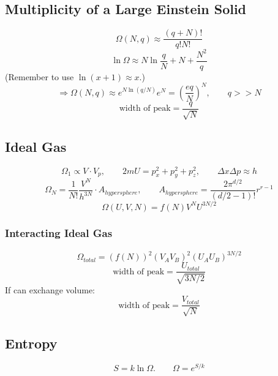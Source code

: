 \documentclass[a4paper,norsk, 10pt]{article}
\begin{document}
\subsection{Multiplicity of a Large Einstein Solid}
\begin{equation}
\Omega(N,q) \approx \frac{(q+N)!}{q!N!}
\end{equation}
\begin{equation}
\ln\Omega \approx N\ln\frac{q}{N} + N + \frac{N^2}{q}
\end{equation}
(Remember to use $\ln(x+1) \approx x$.)
\begin{equation}
\Rightarrow \Omega(N,q) \approx e^{N\ln(q/N)}e^N = \left(\frac{eq}{N}\right)^N,\qquad q >>N
\end{equation}
\begin{equation}
\text{width of peak} = \frac{q}{\sqrt{N}}
\end{equation}
\subsection{Ideal Gas}
\begin{equation}
\Omega_1 \propto V\cdot V_p,\qquad 2mU = p^2_x + p^2_y + p^2_z,\qquad \Delta x \Delta p \approx h 
\end{equation}
\begin{equation}
\Omega_N = \frac{1}{N!}\frac{V^N}{h^{3N}}\cdot A_{hypersphere},\qquad A_{hypersphere} = \frac{2\pi^{d/2}}{(d/2 - 1)!}r^{r-1}
\end{equation}
\begin{equation}
\Omega(U,V,N) = f(N)V^NU^{3N/2}
\end{equation}
\subsubsection{Interacting Ideal Gas}
\begin{equation}
\Omega_{total} = (f(N))^2(V_AV_B)^2(U_AU_B)^{3N/2}
\end{equation}
\begin{equation}
\text{width of peak} = \frac{U_{total}}{\sqrt{3N/2}}
\end{equation}
If can exchange volume:
\begin{equation}
\text{width of peak} = \frac{V_{total}}{\sqrt{N}}
\end{equation}

\subsection{Entropy}
\begin{equation}
S = k\ln\Omega. \qquad \Omega = e^{S/k}
\end{equation}
\end{document}
